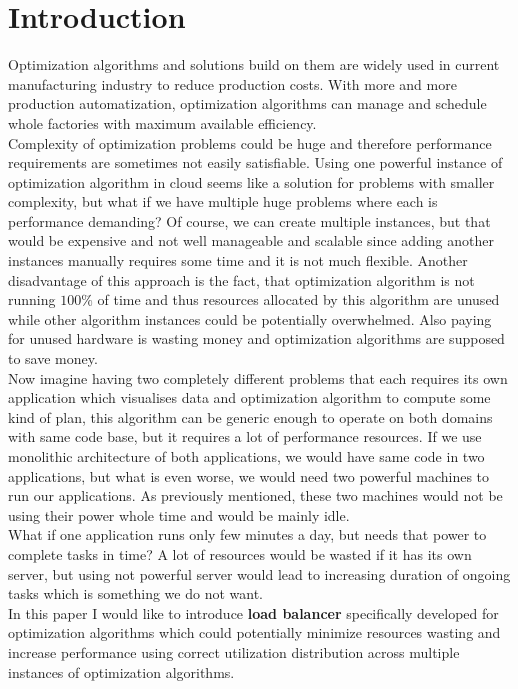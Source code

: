 
\chapter{Introduction}\label{ch:introduction}
Optimization algorithms and solutions build on them are widely used in current manufacturing industry to reduce production costs.
With more and more production automatization, optimization algorithms can manage and schedule whole factories with maximum available efficiency.\\
Complexity of optimization problems could be huge and therefore performance requirements are sometimes not easily satisfiable.
Using one powerful instance of optimization algorithm in cloud seems like a solution for problems with smaller complexity,
but what if we have multiple huge problems where each is performance demanding?
Of course, we can create multiple instances, but that would be expensive and not well manageable and scalable
since adding another instances manually requires some time and it is not much flexible.
Another disadvantage of this approach is the fact, that optimization algorithm is not running $100\%$ of time
and thus resources allocated by this algorithm are unused while other algorithm instances could be potentially overwhelmed.
Also paying for unused hardware is wasting money and optimization algorithms are supposed to save money.\\
Now imagine having two completely different problems that each requires its own application which visualises data
and optimization algorithm to compute some kind of plan,
this algorithm can be generic enough to operate on both domains with same code base, but it requires a lot of performance resources.
If we use monolithic architecture of both applications,
we would have same code in two applications,
but what is even worse, we would need two powerful machines to run our applications.
As previously mentioned, these two machines would not be using their power whole time and would be mainly idle.\\
What if one application runs only few minutes a day, but needs that power to complete tasks in time?
A lot of resources would be wasted if it has its own server,
but using not powerful server would lead to increasing duration of ongoing tasks which is something we do not want.\\
In this paper I would like to introduce \textbf{load balancer} specifically developed for optimization algorithms
which could potentially minimize resources wasting and increase performance using correct utilization distribution across
multiple instances of optimization algorithms.






